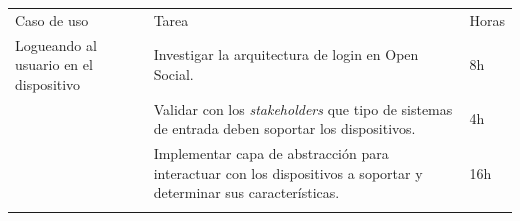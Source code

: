 \begin{longtable}[c]{@{}lll@{}}
\hline\noalign{\medskip}
\begin{minipage}[b]{0.28\columnwidth}\raggedright
Caso de uso
\end{minipage} & \begin{minipage}[b]{0.62\columnwidth}\raggedright
Tarea
\end{minipage} & \begin{minipage}[b]{0.10\columnwidth}\raggedright
Horas
\end{minipage}
\\\noalign{\medskip}
\hline\noalign{\medskip}
\begin{minipage}[t]{0.28\columnwidth}\raggedright
Logueando al usuario en el dispositivo
\end{minipage} & \begin{minipage}[t]{0.62\columnwidth}\raggedright
Investigar la arquitectura de login en Open Social.
\end{minipage} & \begin{minipage}[t]{0.10\columnwidth}\raggedright
8h
\end{minipage}
\\\noalign{\medskip}
\begin{minipage}[t]{0.28\columnwidth}\raggedright
\end{minipage} & \begin{minipage}[t]{0.62\columnwidth}\raggedright
Validar con los \emph{stakeholders} que tipo de sistemas de entrada
deben soportar los dispositivos.
\end{minipage} & \begin{minipage}[t]{0.10\columnwidth}\raggedright
4h
\end{minipage}
\\\noalign{\medskip}
\begin{minipage}[t]{0.28\columnwidth}\raggedright
\end{minipage} & \begin{minipage}[t]{0.62\columnwidth}\raggedright
Implementar capa de abstracción para interactuar con los dispositivos a
soportar y determinar sus características.
\end{minipage} & \begin{minipage}[t]{0.10\columnwidth}\raggedright
16h
\end{minipage}
\\\noalign{\medskip}
\begin{minipage}[t]{0.28\columnwidth}\raggedright
\end{minipage} & \begin{minipage}[t]{0.62\columnwidth}\raggedright

\end{minipage}
\end{longtable}
